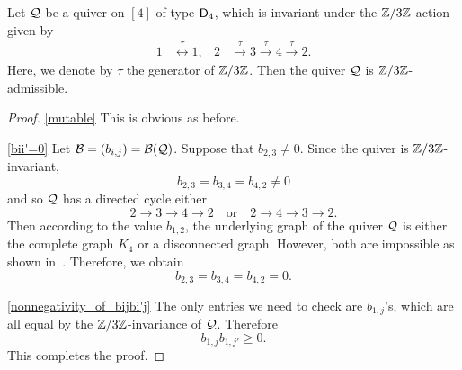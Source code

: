 \begin{proposition}\label{proposition:admissibility for D4}
Let $\mathcal{Q}$ be a quiver on $[4]$ of type $\mathsf{D}_{4}$, which is invariant under the $\mathbb{Z}/3\mathbb{Z}$-action given by
\begin{align*}
1&\stackrel{\tau}{\longleftrightarrow} 1,& 2&\stackrel{\tau}{\longrightarrow} 3\stackrel{\tau}{\longrightarrow} 4\stackrel{\tau}{\longrightarrow} 2.
\end{align*}
Here, we denote by $\tau$ the generator of $\mathbb{Z}/3\mathbb{Z}$.
Then the quiver $\mathcal{Q}$ is $\mathbb{Z}/3\mathbb{Z}$-admissible.
\end{proposition}
\begin{proof}
\noindent \eqref{mutable} This is obvious as before.

\noindent \eqref{bii'=0} Let $\mathcal{B}=(b_{i,j})=\mathcal{B}(\mathcal{Q})$. Suppose that $b_{2,3}\neq0$. Since the quiver is $\mathbb{Z}/3\mathbb{Z}$-invariant,
\[
b_{2,3}=b_{3,4}=b_{4,2}\neq0
\]
and so $\mathcal{Q}$ has a directed cycle either
\[
2\to3\to4\to 2\quad\text{or}\quad 2\to4\to3\to 2.
\]
Then according to the value $b_{1,2}$, the underlying graph of the quiver $\mathcal{Q}$ is either the complete graph $K_4$ or a disconnected graph.
However, both are impossible as shown in~\cite[Figure~1]{BuanTorkildsen09}. 
Therefore, we obtain
\[
b_{2,3}=b_{3,4}=b_{4,2}=0.
\]

\noindent \eqref{nonnegativity_of_bijbi'j} The only entries we need to check are $b_{1,j}$'s, which are all equal by the $\mathbb{Z}/3\mathbb{Z}$-invariance of $\mathcal{Q}$. Therefore
\[
b_{1,j}b_{1,j'}\ge 0.
\]
This completes the proof.
\end{proof}


